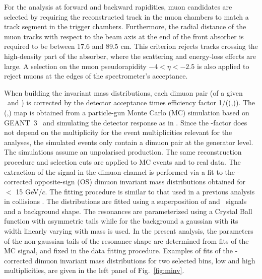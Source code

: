  For the \jpsi analysis at forward and backward rapidities, muon candidates are selected by requiring the reconstructed track in the muon chambers to match a track segment in the trigger chambers. Furthermore, the radial distance of the muon tracks with respect to the beam axis at the end of the front absorber is required to be between 17.6 and 89.5 cm. This criterion rejects tracks crossing the high-density part of the absorber, where the scattering and energy-loss effects are large. A selection on the muon pseudorapidity $-4  < \eta <  -2.5 $ is also applied to reject muons at the edges of the spectrometer's acceptance. 

When building the invariant mass distributions, each dimuon pair (of a given \pt ~and \y) is corrected by the detector acceptance times efficiency factor 1/(\acef(\pt,\y)). The  \acef(\pt,\y) map is obtained from a particle-gun Monte Carlo (MC) simulation based on GEANT~3~\cite{GEANT3} and simulating the detector response as in \cite{Abelev:2014aa}. Since  the \acef-factor does not depend on the multiplicity for the event multiplicities relevant for the \ppb analyses, the simulated events only contain a dimuon pair at the generator level.  The simulations assume an unpolarised \jpsi production. The same reconstruction procedure and selection cuts are applied to MC events and to real data.
The extraction of the \jpsi signal in the dimuon channel is performed via a fit to the \acef-corrected opposite-sign (OS) dimuon invariant mass distributions obtained for \pt ~$<$ 15 GeV/$c$. The fitting procedure is similar to that used in a previous \jpsi analysis in \ppb collisions \cite{Abelev:2014aa}. The distributions are fitted using a superposition of \jpsi and \psip~signals and a background shape. 
The resonances are parameterized using a Crystal Ball function with asymmetric tails while for the background a gaussian with its width linearly varying with mass is used. In the present analysis, the parameters of the non-gaussian tails of the resonance shape are determined from fits of the MC \jpsi signal, and fixed in the data fitting procedure. Examples of fits of the \acef-corrected dimuon invariant mass distributions for two selected bins, low and high multiplicities, are given in the left panel of Fig.~\ref{fig:minv}.

